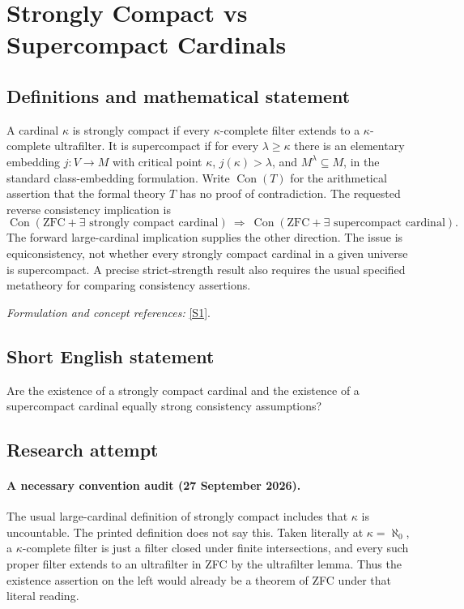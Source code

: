 \documentclass[11pt]{article}
\begin{document}
\section*{\texorpdfstring{Strongly Compact vs Supercompact Cardinals}{Strongly Compact vs Supercompact Cardinals}}\label{statement}
\subsection{Definitions and mathematical statement}
A cardinal $\kappa$ is strongly compact if every $\kappa$-complete filter extends to a $\kappa$-complete ultrafilter. It is supercompact if for every $\lambda\ge\kappa$ there is an elementary embedding $j:V\to M$ with critical point $\kappa$, $j(\kappa)>\lambda$, and $M^\lambda\subseteq M$, in the standard class-embedding formulation. Write $\operatorname{Con}(T)$ for the arithmetical assertion that the formal theory $T$ has no proof of contradiction. The requested reverse consistency implication is
\[
 \operatorname{Con}(\mathrm{ZFC}+\exists\text{ strongly compact cardinal})
 \ \Longrightarrow\
 \operatorname{Con}(\mathrm{ZFC}+\exists\text{ supercompact cardinal}).
\]
The forward large-cardinal implication supplies the other direction. The issue is equiconsistency, not whether every strongly compact cardinal in a given universe is supercompact. A precise strict-strength result also requires the usual specified metatheory for comparing consistency assertions.
\par\smallskip\textit{Formulation and concept references:} \href{https://arxiv.org/abs/1810.05058}{[S1]}.

\subsection{Short English statement}
Are the existence of a strongly compact cardinal and the existence of a supercompact cardinal equally strong consistency assumptions?
\subsection{Research attempt}
\paragraph{A necessary convention audit (27 September 2026).}
The usual large-cardinal definition of strongly compact includes that
$\kappa$ is uncountable. The printed definition does not say this.
Taken literally at $\kappa=\aleph_0$, a $\kappa$-complete filter is
just a filter closed under finite intersections, and every such proper
filter extends to an ultrafilter in ZFC by the ultrafilter lemma.
Thus the existence assertion on the left would already be a theorem
of ZFC under that literal reading.
\end{document}

